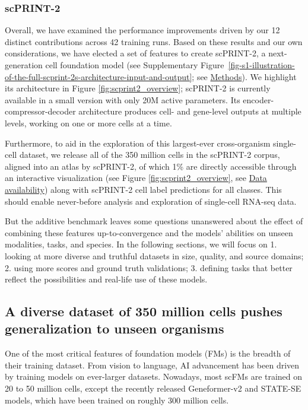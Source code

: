 \subsubsection{\gls{scPRINT}-2}\label{scprint-2}

Overall, we have examined the performance improvements driven by our 12
distinct contributions across 42 training runs. Based on these results
and our own considerations, we have elected a set of features to create
\gls{scPRINT}-2, a next-generation cell foundation model (see Supplementary Figure~\ref{fig-s1-illustration-of-the-full-scprint-2s-architecture-input-and-output};
see \hyperref[scprint-2-1]{Methods}). We highlight its architecture
in Figure \ref{fig:scprint2_overview}; \gls{scPRINT}-2 is currently available in a small version with
only 20M active parameters. Its encoder-compressor-decoder architecture
produces cell- and gene-level outputs at multiple levels, working on one
or more cells at a time.

Furthermore, to aid in the exploration of this largest-ever
cross-organism single-cell dataset, we release all of the 350 million
cells in the \gls{scPRINT}-2 corpus, aligned into an atlas by \gls{scPRINT}-2, of
which 1\% are directly accessible through an interactive visualization
(see Figure \ref{fig:scprint2_overview}, see \hyperref[data-availability]{Data
availability}) along with \gls{scPRINT}-2 cell label predictions for all
classes. This should enable never-before analysis and exploration of
single-cell RNA-seq data.

But the additive benchmark leaves some questions unanswered about the
effect of combining these features up-to-convergence and the models'
abilities on unseen modalities, tasks, and species. In the following
sections, we will focus on 1. looking at more diverse and truthful
datasets in size, quality, and source domains; 2. using more scores and
ground truth validations; 3. defining tasks that better reflect the
possibilities and real-life use of these models.

\subsection{A diverse dataset of 350 million cells pushes generalization
to unseen
organisms}\label{a-diverse-dataset-of-350-million-cells-pushes-generalization-to-unseen-organisms}

One of the most critical features of foundation models (FMs) is the
breadth of their training dataset. From vision to language, AI
advancement has been driven by training models on ever-larger
datasets\citep{brixiGenomeModelingDesign2025,openaiGPT4TechnicalReport2024,kaplanScalingLawsNeural2020,oquabDINOv2LearningRobust2024,chenUNIGeneralpurposeFoundation2024}. Nowadays, most \gls{scFM}s are trained on 20
to 50 million cells, except the recently released Geneformer-v2 and
STATE-SE models, which have been trained on roughly 300 million
cells\citep{chenQuantizedMultitaskLearning2024,predictingCellularResponsesPerturbation2025}.

